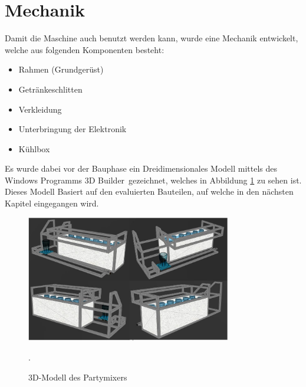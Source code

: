 \section{Mechanik}
\label{sec:Mechanik}

Damit die Maschine auch benutzt werden kann, wurde eine Mechanik entwickelt, welche aus folgenden Komponenten besteht: 

\begin{itemize}
\item Rahmen (Grundgerüst)
\item Getränkeschlitten 
\item Verkleidung
\item Unterbringung der Elektronik
\item Kühlbox
\end{itemize}

Es wurde dabei vor der Bauphase ein Dreidimensionales Modell mittels des Windows Programms \flqq 3D Builder\frqq~gezeichnet, welches in Abbildung \ref{fig:3DModell} zu sehen ist. Dieses Modell Basiert auf den evaluierten Bauteilen, auf welche in den nächsten Kapitel eingegangen wird.

\begin{figure}[H]
	\centering
	\includegraphics[width=0.8\textwidth]{graphics/3DModell}
	\caption{3D-Modell des Partymixers}.
	\label{fig:3DModell}
\end{figure}

